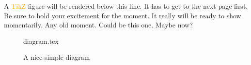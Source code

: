 A \textcolor{orange}{TikZ}
 figure will be rendered below this line. It has to get to the next page first. Be sure to hold your excitement for the moment. It really will be ready to show momentarily. Any old moment. Could be this one. Maybe now? 
 \begin{figure}[ht]
 {diagram.tex}
 \label{fig:tikzexample}
\caption{A nice simple diagram}
\end{figure}




